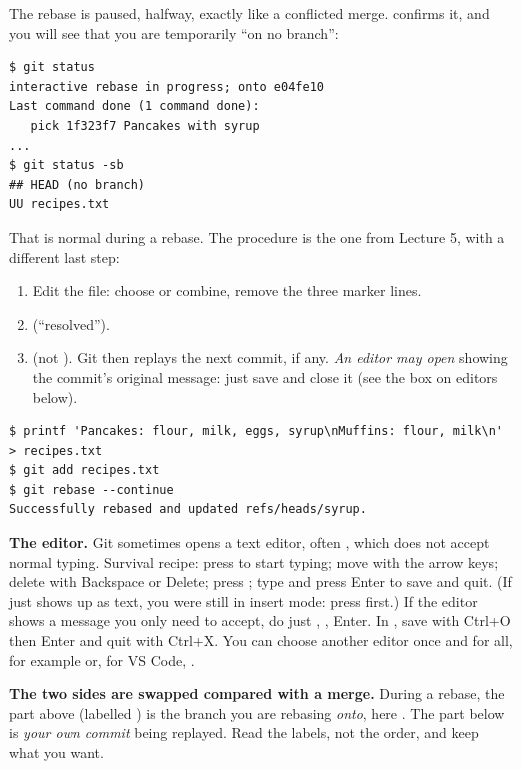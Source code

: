 The rebase is paused, halfway, exactly like a conflicted merge.  confirms it, and you will see that you are temporarily ``on no branch'':

\begin{lstlisting}
$ git status
interactive rebase in progress; onto e04fe10
Last command done (1 command done):
   pick 1f323f7 Pancakes with syrup
...
$ git status -sb
## HEAD (no branch)
UU recipes.txt
\end{lstlisting}

That is normal during a rebase. The procedure is the one from Lecture 5, with a different last step:

\begin{enumerate}
  \item Edit the file: choose or combine, remove the three marker lines.
  \item {} (``resolved'').
  \item {} (not ). Git then replays the next commit, if any. \emph{An editor may open} showing the commit's original message: just save and close it (see the box on editors below).
\end{enumerate}

\begin{lstlisting}
$ printf 'Pancakes: flour, milk, eggs, syrup\nMuffins: flour, milk\n' > recipes.txt
$ git add recipes.txt
$ git rebase --continue
Successfully rebased and updated refs/heads/syrup.
\end{lstlisting}

\begin{pitfall}
\textbf{The editor.} Git sometimes opens a text editor, often , which does not accept normal typing. Survival recipe: press  to start typing; move with the arrow keys; delete with Backspace or Delete; press ; type  and press Enter to save and quit. (If  just shows up as text, you were still in insert mode: press  first.) If the editor shows a message you only need to accept, do just , , Enter. In , save with Ctrl+O then Enter and quit with Ctrl+X. You can choose another editor once and for all, for example  or, for VS Code, .
\end{pitfall}

\begin{pitfall}
\textbf{The two sides are swapped compared with a merge.} During a rebase, the part above \code{=======} (labelled ) is the branch you are rebasing \emph{onto}, here . The part below is \emph{your own commit} being replayed. Read the labels, not the order, and keep what you want.
\end{pitfall}

